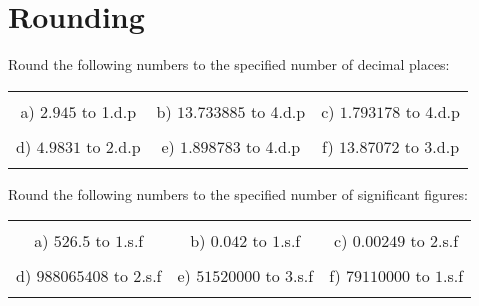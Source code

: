 \documentclass[12pt]{article}
\begin{document}
\pagestyle{fancy}
\fancyfoot{} 
\section{Rounding}
Round the following numbers to the specified number of decimal places:
\begin{table}[h!]
\centering
\begin{tabular}{c c c}
\hspace{4cm} & \hspace{4cm} & \hspace{4cm} \\
a) ${2}.{9}{4}{5}$ to 1.d.p & b) ${13}.{7}{3}{3}{8}{8}{5}$ to 4.d.p & c) ${1}.{7}{9}{3}{1}{7}{8}$ to 4.d.p\\ \\
d) ${4}.{9}{8}{3}{1}$ to 2.d.p & e) ${1}.{8}{9}{8}{7}{8}{3}$ to 4.d.p & f) ${13}.{8}{7}{0}{7}{2}$ to 3.d.p\\ \\
\end{tabular}
\end{table}
\newline
Round the following numbers to the specified number of significant figures:
\begin{table}[h!]
\centering
\begin{tabular}{c c c}
\hspace{4cm} & \hspace{4cm} & \hspace{4cm} \\
a) $526.5$ to $1$.s.f & b) $0.042$ to $1$.s.f & c) $0.00249$ to $2$.s.f\\ \\
d) $988065408$ to $2$.s.f & e) $51520000$ to $3$.s.f & f) $79110000$ to $1$.s.f\\ \\
\end{tabular}
\end{table}
\newline
\end{document}
